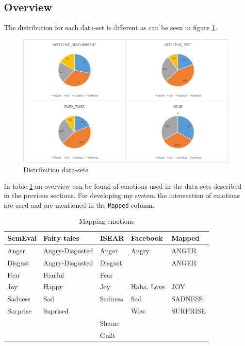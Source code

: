 \documentclass[11pt]{article}
\begin{document}
\subsection{Overview}
The distribution for each data-set is different as can be seen in figure \ref{fig:distribution_data-sets}. 
\begin{figure}[hbt]
  \includegraphics[width=\linewidth]{distribution_data.png}
  \caption{Distribution data-sets}
  \label{fig:distribution_data-sets}
\end{figure}
In table \ref{overview_data-sets} an overview can be found of emotions used in the data-sets described in the previous sections. For developing my system the intersection of emotions are used and are mentioned in the \texttt{Mapped} column.
\begin{table}[htb]
\centering

\begin{tabular}{|l|l|l|l|l|}
\hline
\textbf{SemEval} & \textbf{Fairy tales} & \textbf{ISEAR} & \textbf{Facebook} & \textbf{Mapped} \\ \hline
Anger            & Angry-Disgusted      & Anger               & Angry   & ANGER          \\ \hline
Disgust          & Angry-Disgusted      & Disgust               &    &  ANGER              \\ \hline
Fear             & Fearful              & Fear               &      &              \\ \hline
Joy              & Happy                & Joy                & Haha, Love & JOY\\ \hline
Sadness          & Sad                  & Sadness               & Sad     & SADNESS          \\ \hline
Surprise         & Suprised             &                & Wow          & SURPRISE     \\ 
\hline
                 &                      & Shame               &       &         \\ \hline
                 &                      & Guilt               &       &         \\                  
\hline
\end{tabular}
\caption{Mapping emotions}
\label{overview_data-sets}
\end{table}
\end{document}
